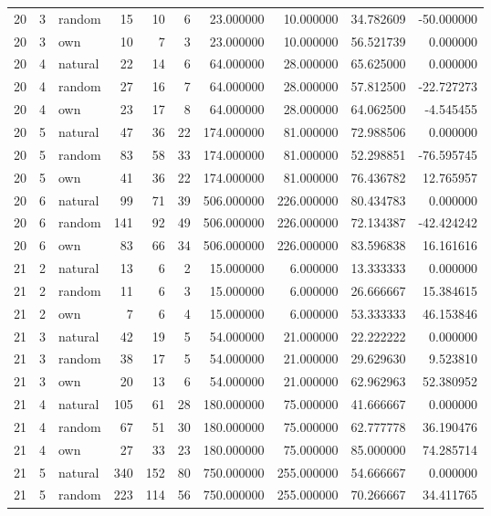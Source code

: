\begin{table}[htbp]
\begin{tabular}{rrlrrrrrrr}
20 & 3 & random & 15 & 10 & 6 & 23.000000 & 10.000000 & 34.782609 & -50.000000 \\
20 & 3 & own & 10 & 7 & 3 & 23.000000 & 10.000000 & 56.521739 & 0.000000 \\
20 & 4 & natural & 22 & 14 & 6 & 64.000000 & 28.000000 & 65.625000 & 0.000000 \\
20 & 4 & random & 27 & 16 & 7 & 64.000000 & 28.000000 & 57.812500 & -22.727273 \\
20 & 4 & own & 23 & 17 & 8 & 64.000000 & 28.000000 & 64.062500 & -4.545455 \\
20 & 5 & natural & 47 & 36 & 22 & 174.000000 & 81.000000 & 72.988506 & 0.000000 \\
20 & 5 & random & 83 & 58 & 33 & 174.000000 & 81.000000 & 52.298851 & -76.595745 \\
20 & 5 & own & 41 & 36 & 22 & 174.000000 & 81.000000 & 76.436782 & 12.765957 \\
20 & 6 & natural & 99 & 71 & 39 & 506.000000 & 226.000000 & 80.434783 & 0.000000 \\
20 & 6 & random & 141 & 92 & 49 & 506.000000 & 226.000000 & 72.134387 & -42.424242 \\
20 & 6 & own & 83 & 66 & 34 & 506.000000 & 226.000000 & 83.596838 & 16.161616 \\
21 & 2 & natural & 13 & 6 & 2 & 15.000000 & 6.000000 & 13.333333 & 0.000000 \\
21 & 2 & random & 11 & 6 & 3 & 15.000000 & 6.000000 & 26.666667 & 15.384615 \\
21 & 2 & own & 7 & 6 & 4 & 15.000000 & 6.000000 & 53.333333 & 46.153846 \\
21 & 3 & natural & 42 & 19 & 5 & 54.000000 & 21.000000 & 22.222222 & 0.000000 \\
21 & 3 & random & 38 & 17 & 5 & 54.000000 & 21.000000 & 29.629630 & 9.523810 \\
21 & 3 & own & 20 & 13 & 6 & 54.000000 & 21.000000 & 62.962963 & 52.380952 \\
21 & 4 & natural & 105 & 61 & 28 & 180.000000 & 75.000000 & 41.666667 & 0.000000 \\
21 & 4 & random & 67 & 51 & 30 & 180.000000 & 75.000000 & 62.777778 & 36.190476 \\
21 & 4 & own & 27 & 33 & 23 & 180.000000 & 75.000000 & 85.000000 & 74.285714 \\
21 & 5 & natural & 340 & 152 & 80 & 750.000000 & 255.000000 & 54.666667 & 0.000000 \\
21 & 5 & random & 223 & 114 & 56 & 750.000000 & 255.000000 & 70.266667 & 34.411765 \\

\end{tabular}
\end{table}
